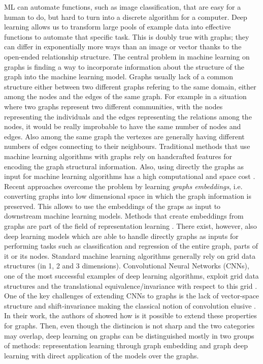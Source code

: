 ML can automate functions, such as image classification, that are easy for a human to do, but hard to turn into a discrete algorithm for a computer. Deep learning allows us to transform large pools of example data into effective functions to automate that specific task. This is doubly true with graphs; they can differ in exponentially more ways than an image or vector thanks to the open-ended relationship structure. The central problem in machine learning on graphs is finding a way to incorporate information about the structure of the graph into the machine learning model. Graphs usually lack of a common structure either between two different graphs refering to the same domain, either among the nodes and the edges of the same graph. For example in a situation where two graphs represent two different communities, with the nodes representing the individuals and the edges representing the relations among the nodes, it would be really improbable to have the same number of nodes and edges. Also among the same graph the vertexes are generally having different numbers of edges connecting to their neighbours. Traditional methods that use machine learning algorithms with graphs rely on handcrafted features for encoding the graph structural information. Also, using directly the graphs as input for machine learning algorithms has a high computational and space cost \cite{surveyGraphEmbedding}. Recent approaches overcome the problem by learning \textit{graphs embeddings}, i.e. converting graphs into low dimensional space in which the graph information is preserved. This allows to use the embeddings of the graps as input to downstream machine learning models. Methods that create embeddings from graphs are part of the field of representation learning \cite{representationLearning}. There exist, however, also deep learning models which are able to handle directly graphs as inputs for performing tasks such as classification and regression of the entire graph, parts of it or its nodes. Standard machine learning algorithms generally rely on grid data structures (in 1, 2 and 3 dimensions). Convolutional Neural Networks (CNNs), one of the most successful examples of deep learning algorithms, exploit grid data structures and the translational equivalence/invariance with respect to this grid  \cite{spectral_networks_local_connected_networks}. One of the key challenges of extending CNNs to graphs is the lack of vector-space structure and shift-invariance making the classical notion of convolution elusive \cite{cayley_nets}. In their work, the authors of \cite{spectral_networks_local_connected_networks} showed how is it possible to extend these properties for graphs.
Then, even though the distincion is not sharp and the two categories may overlap, deep learning on graphs can be distinguished mostly in two groups of methods: representation learning through graph embedding and graph deep learning with direct application of the models over the graphs. 

